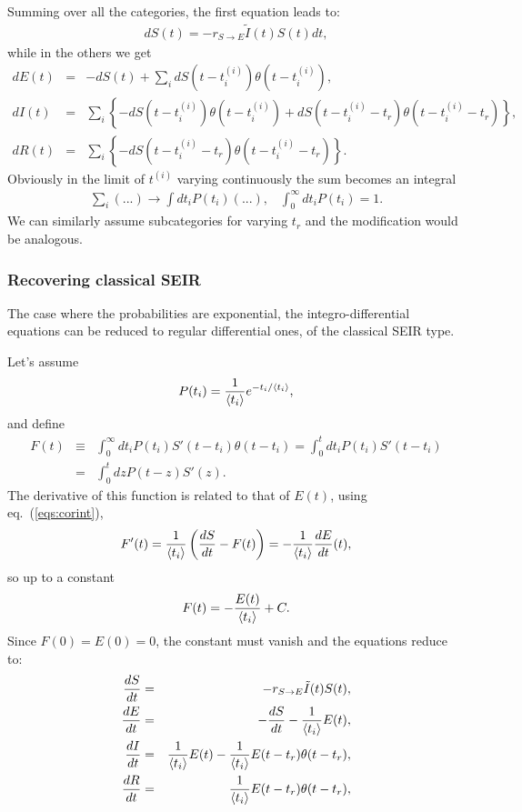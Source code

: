 \documentclass[a4paper,oneside,11pt]{article}
\begin{document}
Summing over all the categories, the first equation leads to:
\begin{eqnarray}
d S(t) = - r_{S\rightarrow E} \tilde{I}(t) S(t) dt, 
\end{eqnarray}
while in the others we get
\begin{eqnarray}
d E(t) &=& -d S(t) + \sum_i d S(t-t^{(i)}_i) \theta(t-t^{(i)}_i) ,\nonumber\\
d I(t) &=& \sum_i  \left\{-d S(t-t^{(i)}_i) \theta(t-t^{(i)}_i)+ d S(t-t^{(i)}_i-t_r) \theta(t-t^{(i)}_i-t_r)\right\},\nonumber\\
d R(t) &=& \sum_i \left\{- d S(t - t^{(i)}_i - t_r) \theta(t-t^{(i)}_i-t_r)\right\}.\nonumber
\label{eqs:corint}
\end{eqnarray}
Obviously in the limit of $t^{(i)}$ varying continuously the sum becomes an integral
\begin{eqnarray}
\sum_i  (...) \rightarrow \int dt_i P(t_i) (...), \;\;\; \int_0^\infty dt_i P(t_i) = 1.
\end{eqnarray}
We can similarly assume subcategories for varying $t_r$ and the modification would be analogous. 

\subsubsection{Recovering classical SEIR}

The case where the probabilities are exponential, the integro-differential equations can be reduced to regular differential ones, of the classical SEIR type.

 Let's assume 
\begin{eqnarray}
P(t_i) = {1\over \langle t_i\rangle} e^{-t_i/\langle t_i\rangle},
\end{eqnarray}
and define
\begin{eqnarray}
F(t) &\equiv& \int_0^\infty dt_iP(t_i) S'(t-t_i) \theta(t-t_i) = \int_0^t dt_i P(t_i)  S'(t-t_i) \nonumber\\
&=& \int_0^t dz P(t-z) S'(z).
\end{eqnarray}
The derivative of this function is related to that of $E(t)$, using eq.~(\ref{eqs:corint}), 
\begin{eqnarray}
F'(t) = {1\over \langle t_i\rangle} \left({d S\over dt}-F(t)\right) = - {1\over \langle t_i\rangle} {dE\over d t}(t), 
\end{eqnarray}
so up to a constant 
\begin{eqnarray}
F(t) = -{E(t)\over \langle t_i\rangle} +C.
\end{eqnarray}
Since $F(0) = E(0) =0$, the constant must vanish and the equations reduce to:
\begin{eqnarray}
{d S\over dt} &=& - r_{S\rightarrow E} \tilde{I}(t) S(t),\nonumber\\ 
{d E\over dt} &=& -{d S\over d t} - {1 \over \langle t_i\rangle} E(t) ,\nonumber\\
{d I\over dt} &=& {1 \over \langle t_i\rangle} E(t) -{1\over \langle t_i\rangle} E(t-t_r) \theta(t-t_r),\nonumber\\
{d R\over d t} &=&  {1\over  \langle t_i\rangle} E(t-t_r) \theta(t-t_r),\nonumber\\
\end{eqnarray}
\end{document}
